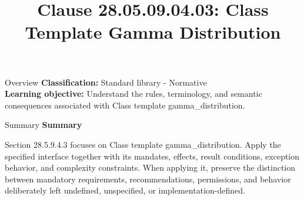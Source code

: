 \documentclass[10pt,letterpaper]{article}
\title{Clause 28.05.09.04.03: Class Template Gamma Distribution}
\author{}
\date{}
\begin{document}
\maketitle
\begin{CornellOverviewBox}{Overview}
\textbf{Classification:} Standard library - Normative\\[2pt]
\textbf{Learning objective:} Understand the rules, terminology, and semantic consequences associated with Class template gamma\_distribution.
\end{CornellOverviewBox}\begin{CornellSummaryBox}{Summary}
{\sffamily\bfseries\color{Accent} Summary}\par\vspace{3pt}Section 28.5.9.4.3 focuses on Class template gamma\_distribution. Apply the specified interface together with its mandates, effects, result conditions, exception behavior, and complexity constraints. When applying it, preserve the distinction between mandatory requirements, recommendations, permissions, and behavior deliberately left undefined, unspecified, or implementation-defined.
\end{CornellSummaryBox}
\end{document}
